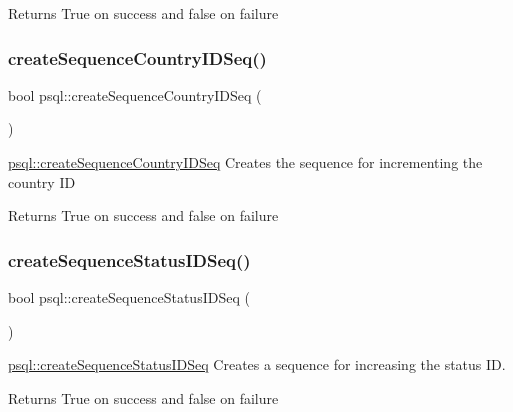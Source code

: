 \begin{DoxyReturn}{Returns}
True on success and false on failure 
\end{DoxyReturn}
\mbox{\label{classpsql_aa907c84f592212451d3d59a2061adabd}} 
\subsubsection{\texorpdfstring{createSequenceCountryIDSeq()}{createSequenceCountryIDSeq()}}
{\footnotesize\ttfamily bool psql\+::create\+Sequence\+Country\+I\+D\+Seq (\begin{DoxyParamCaption}{ }\end{DoxyParamCaption})}



\mbox{\hyperlink{classpsql_aa907c84f592212451d3d59a2061adabd}{psql\+::create\+Sequence\+Country\+I\+D\+Seq}} Creates the sequence for incrementing the country ID 

\begin{DoxyReturn}{Returns}
True on success and false on failure 
\end{DoxyReturn}
\mbox{\label{classpsql_ae882aa80b2d629383fc2e60aecfd421a}} 
\subsubsection{\texorpdfstring{createSequenceStatusIDSeq()}{createSequenceStatusIDSeq()}}
{\footnotesize\ttfamily bool psql\+::create\+Sequence\+Status\+I\+D\+Seq (\begin{DoxyParamCaption}{ }\end{DoxyParamCaption})}



\mbox{\hyperlink{classpsql_ae882aa80b2d629383fc2e60aecfd421a}{psql\+::create\+Sequence\+Status\+I\+D\+Seq}} Creates a sequence for increasing the status ID. 

\begin{DoxyReturn}{Returns}
True on success and false on failure 
\end{DoxyReturn}
\mbox{\label{classpsql_a6ce21cb5a1e77cb0c280e2932d2b557d}} 
